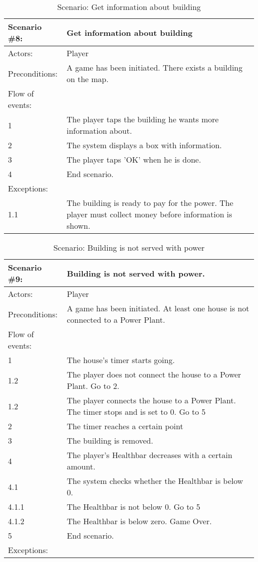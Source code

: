 \begin{table}
	\begin{tabular}{| l | p{10cm} |}
		\hline
		\rowcolor{lightgray}
		{\bf Scenario \#8:} & {\bf Get information about building} \\ \hline
		Actors: & Player \\ \hline
		Preconditions: & A game has been initiated. There exists a building on the map. \\ \hline
		\rowcolor{lightergray}
		Flow of events: & \\ \hline
		1 & The player taps the building he wants more information about. \\ \hline
		2 & The system displays a box with information. \\ \hline
		3 & The player taps 'OK' when he is done. \\ \hline
		4 & End scenario. \\ \hline
		\rowcolor{lightergray}
		Exceptions: & \\ \hline
		1.1 & The building is ready to pay for the power. The player must collect money before information is shown. \\ \hline
	\end{tabular}
\caption{Scenario: Get information about building}
\end{table}

\begin{table}
	\begin{tabular}{| l | p{10cm} |}
		\hline
		\rowcolor{lightgray}
		{\bf Scenario \#9:} & {\bf Building is not served with power.} \\ \hline
		Actors: & Player \\ \hline
		Preconditions: & A game has been initiated. At least one house is not connected to a Power Plant. \\ \hline
		\rowcolor{lightergray}
		Flow of events: & \\ \hline
		1 & The house's timer starts going. \\ \hline
		1.2 & The player does not connect the house to a Power Plant. Go to 2. \\ \hline
		1.2 & The player connects the house to a Power Plant. The timer stops and is set to 0. Go to 5 \\ \hline
		2 & The timer reaches a certain point \\ \hline
		3 & The building is removed. \\ \hline
		4 & The player's Healthbar decreases with a certain amount. \\ \hline
		4.1 & The system checks whether the Healthbar is below 0. \\ \hline
		4.1.1 & The Healthbar is not below 0. Go to 5 \\ \hline
		4.1.2 & The Healthbar is below zero. Game Over. \\ \hline
		5 & End scenario. \\ \hline
		\rowcolor{lightergray}
		Exceptions: & \\ \hline	
	\end{tabular}
	\caption{Scenario: Building is not served with power}
\end{table}

